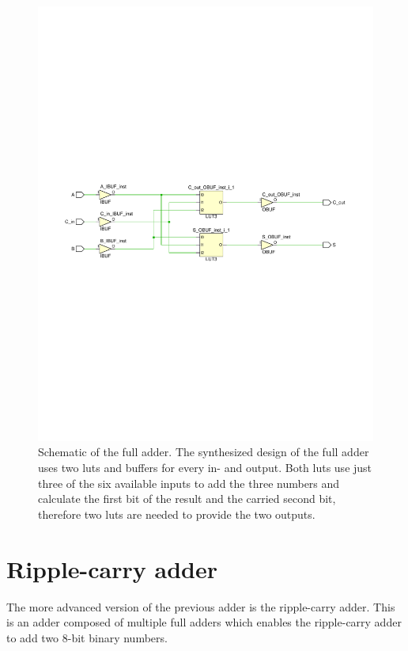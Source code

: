 \begin{figure}[h]
	\centering
	\includegraphics[width=\linewidth, trim=0mm 110mm 0mm 110mm]{./L1/E4/schematic.pdf}
	\caption{Schematic of the full adder. The synthesized design of the full adder uses two \glspl{lut} and buffers for every in- and output. Both \glspl{lut} use just three of the six available inputs to add the three numbers and calculate the first bit of the result and the carried second bit, therefore two \glspl{lut} are needed to provide the two outputs.}
	\label{fig: Full Adder schematic}
\end{figure}



\section{Ripple-carry adder}

The more advanced version of the previous adder is the ripple-carry adder. This is an adder composed of multiple full adders which enables the ripple-carry adder to add two 8-bit binary numbers.

